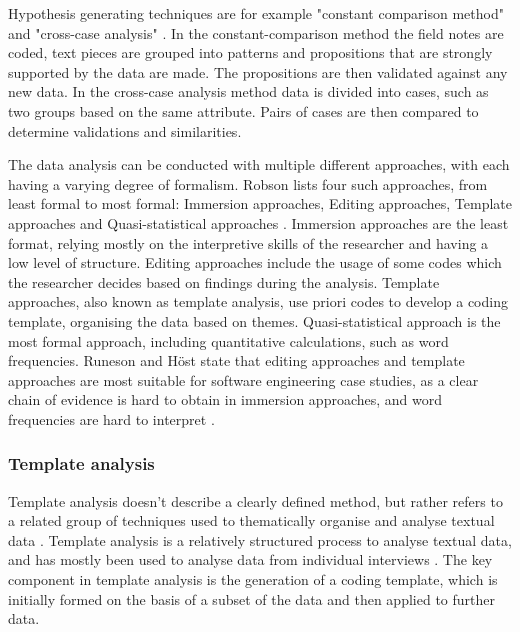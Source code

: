 \documentclass[english]{tktltiki2}
\theoremstyle{definition}
\theoremstyle{remark}
\begin{document}
Hypothesis generating techniques are for example "constant comparison method" and "cross-case analysis" \cite{seaman1999qualitative}. In the constant-comparison method the field notes are coded, text pieces are grouped into patterns and propositions that are strongly supported by the data are made. The propositions are then validated against any new data. In the cross-case analysis method data is divided into cases, such as two groups based on the same attribute. Pairs of cases are then compared to determine validations and similarities. 

The data analysis can be conducted with multiple different approaches, with each having a varying degree of formalism. Robson lists four such approaches, from least formal to most formal: Immersion approaches, Editing approaches, Template approaches and Quasi-statistical approaches \cite{robson2002real}. Immersion approaches are the least format, relying mostly on the interpretive skills of the researcher and having a low level of structure. Editing approaches include the usage of some codes which the researcher decides based on findings during the analysis. Template approaches, also known as template analysis, use priori codes to develop a coding template, organising the data based on themes. Quasi-statistical approach is the most formal approach, including quantitative calculations, such as word frequencies. Runeson and Höst state that editing approaches and template approaches are most suitable for software engineering case studies, as a clear chain of evidence is hard to obtain in immersion approaches, and word frequencies are hard to interpret \cite{runeson2009guidelines}. 

\subsubsection{Template analysis}
Template analysis doesn't describe a clearly defined method, but rather refers to a related group of techniques used to thematically organise and analyse textual data \cite{king2004using}. Template analysis is a relatively structured process to analyse textual data, and has mostly been used to analyse data from individual interviews \cite{king2012doing}. The key component in template analysis is the generation of a coding template, which is initially formed on the basis of a subset of the data and then applied to further data. 
\end{document}
